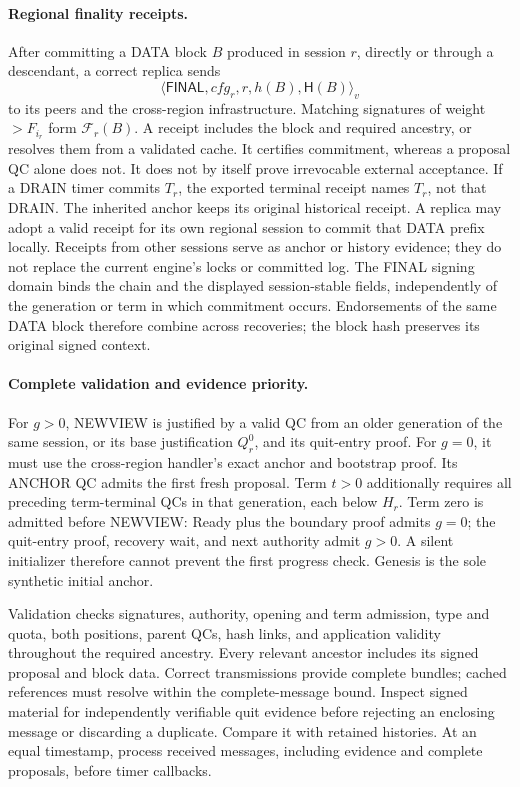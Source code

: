 \documentclass[11pt,a4paper]{article}
\newcommand{\FC}{\mathcal F}
\newcommand{\Hash}{\mathsf H}
\newcommand{\tagg}[1]{\ensuremath{\mathsf{#1}}}
\begin{document}
\paragraph{Regional finality receipts.}
After committing a DATA block $B$ produced in session $r$, directly or
through a descendant, a correct replica sends
\[
 \langle\tagg{FINAL},\mathit{cfg}_r,r,h(B),\Hash(B)\rangle_v
\]
to its peers and the cross-region infrastructure. Matching signatures of
weight $>F_{i_r}$ form $\FC_r(B)$. A receipt includes the block and required
ancestry, or resolves them from a validated cache. It certifies commitment,
whereas a proposal QC alone does not. It does not by itself prove
irrevocable external acceptance. If a DRAIN timer commits $T_r$, the
exported terminal receipt names $T_r$, not that DRAIN. The inherited
anchor keeps its original historical receipt.
A replica may adopt a valid receipt for its own regional session to
commit that DATA prefix locally. Receipts from other sessions serve as
anchor or history evidence; they do not replace the current engine's
locks or committed log.
The FINAL signing domain binds the chain and the displayed session-stable
fields, independently of the generation or term in which commitment
occurs. Endorsements of the same DATA block therefore combine across
recoveries; the block hash preserves its original signed context.

\paragraph{Complete validation and evidence priority.}
For $g>0$, NEWVIEW is justified by a valid QC from an older generation
of the same session, or its base justification $Q_r^0$, and its quit-entry
proof. For $g=0$, it must use the
cross-region handler's exact anchor and bootstrap proof. Its ANCHOR QC
admits the first fresh proposal. Term $t>0$ additionally requires all
preceding term-terminal QCs in that generation, each below $H_r$.
Term zero is admitted before NEWVIEW: Ready plus the boundary proof
admits $g=0$; the quit-entry proof, recovery wait, and next authority admit
$g>0$. A silent initializer therefore cannot prevent the first progress
check. Genesis is the sole synthetic initial anchor.

Validation checks signatures, authority, opening and term admission,
type and quota, both positions, parent QCs, hash links, and application
validity throughout the required ancestry. Every relevant ancestor includes
its signed proposal and block data. Correct transmissions provide complete
bundles; cached references must resolve within the complete-message bound.
Inspect signed material for independently verifiable quit evidence before
rejecting an enclosing message or discarding a duplicate. Compare it with
retained histories. At an equal timestamp, process received messages,
including evidence and complete proposals, before timer callbacks.
\end{document}
